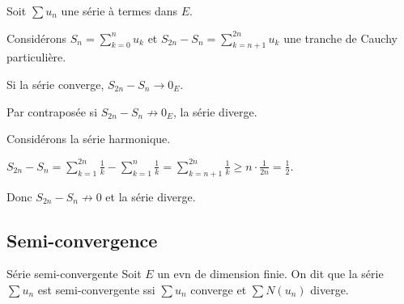 \begin{proposition}{}{}
    Soit $\sum u_n$ une série à termes dans $E$.

    Considérons $\displaystyle S_n = \sum_{k = 0}^n u_k$ et $\displaystyle S_{2n} - S_n = \sum_{k = n + 1}^{2n} u_k$
    une tranche de Cauchy particulière.
    
    Si la série converge, $S_{2n} - S_n \longrightarrow 0_E$.

    Par contraposée si $S_{2n} - S_n \not \longrightarrow 0_E$, la série diverge. 
\end{proposition}


\begin{exemple}
    Considérons la série harmonique. 

    $\displaystyle S_{2n} - S_n = \sum_{k = 1}^{2n} \frac 1 k - \sum_{k = 1}^{n} \frac 1 k = \sum_{k = n + 1}^{2n} \frac 1 k \geqslant n \cdot \frac 1 {2n} = \frac 1 2$.

    Donc $S_{2n} - S_n \not \longrightarrow 0$ et la série diverge.
\end{exemple}

\subsection{Semi-convergence }

\begin{definition}{Série semi-convergente}{}
    Soit $E$ un evn de dimension finie. On dit que la série $\sum u_n$ est semi-convergente 
    ssi $\sum u_n$ converge et $\sum N(u_n)$ diverge.
\end{definition}

